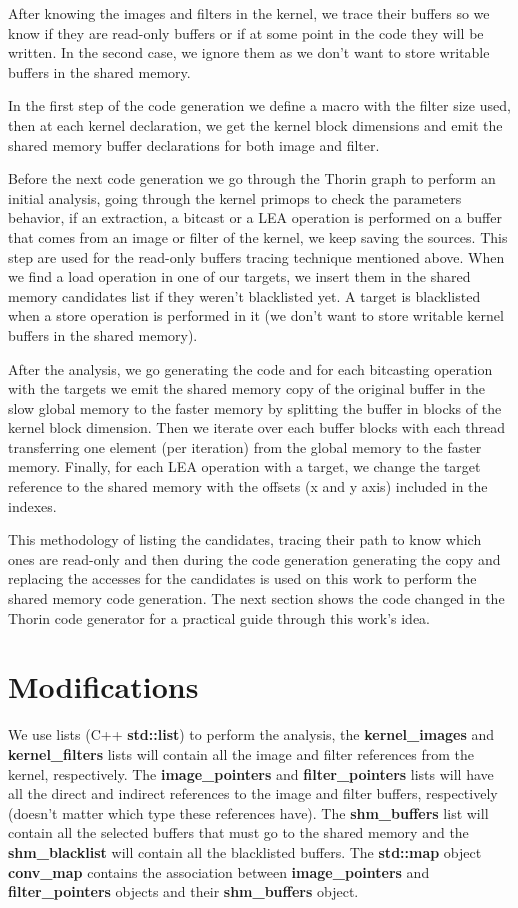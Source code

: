 \documentclass{article}
\begin{document}
After knowing the images and filters in the kernel, we trace their buffers so we know if they are read-only buffers or if at some point in the code they will be written. In the second case, we ignore them as we don't want to store writable buffers in the shared memory.

In the first step of the code generation we define a macro with the filter size used, then at each kernel declaration, we get the kernel block dimensions and emit the shared memory buffer declarations for both image and filter.

Before the next code generation we go through the Thorin graph to perform an initial analysis, going through the kernel primops to check the parameters behavior, if an extraction, a bitcast or a LEA operation is performed on a buffer that comes from an image or filter of the kernel, we keep saving the sources. This step are used for the read-only buffers tracing technique mentioned above. When we find a load operation in one of our targets, we insert them in the shared memory candidates list if they weren't blacklisted yet. A target is blacklisted when a store operation is performed in it (we don't want to store writable kernel buffers in the shared memory).

After the analysis, we go generating the code and for each bitcasting operation with the targets we emit the shared memory copy of the original buffer in the slow global memory to the faster memory by splitting the buffer in blocks of the kernel block dimension. Then we iterate over each buffer blocks with each thread transferring one element (per iteration) from the global memory to the faster memory. Finally, for each LEA operation with a target, we change the target reference to the shared memory with the offsets (x and y axis) included in the indexes.

This methodology of listing the candidates, tracing their path to know which ones are read-only and then during the code generation generating the copy and replacing the accesses for the candidates is used on this work to perform the shared memory code generation. The next section shows the code changed in the Thorin code generator for a practical guide through this work's idea.

\section{Modifications}

We use lists (C++ \textbf{std::list}) to perform the analysis, the \textbf{kernel\_images} and \textbf{kernel\_filters} lists will contain all the image and filter references from the kernel, respectively. The \textbf{image\_pointers} and \textbf{filter\_pointers} lists will have all the direct and indirect references to the image and filter buffers, respectively (doesn't matter which type these references have). The \textbf{shm\_buffers} list will contain all the selected buffers that must go to the shared memory and the \textbf{shm\_blacklist} will contain all the blacklisted buffers. The \textbf{std::map} object \textbf{conv\_map} contains the association between \textbf{image\_pointers} and \textbf{filter\_pointers} objects and their \textbf{shm\_buffers} object.
\end{document}
